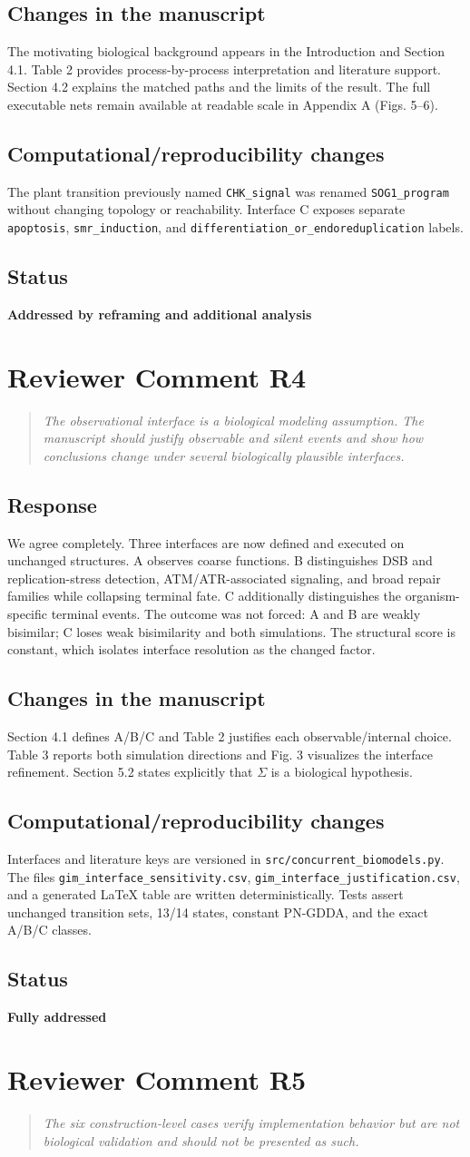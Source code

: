 \documentclass[11pt]{article}
\newcommand{\reviewcomment}[2]{%
  \section*{Reviewer Comment #1}
  \begin{quote}\itshape #2\end{quote}}
\newcommand{\response}{\subsection*{Response}}
\newcommand{\manuscriptchanges}{\subsection*{Changes in the manuscript}}
\newcommand{\computationalchanges}{\subsection*{Computational/reproducibility changes}}
\newcommand{\status}[1]{\subsection*{Status}\textbf{#1}}
\begin{document}
\manuscriptchanges
The motivating biological background appears in the Introduction and Section
4.1. Table 2 provides process-by-process interpretation and literature support.
Section 4.2 explains the matched paths and the limits of the result. The full
executable nets remain available at readable scale in Appendix A (Figs. 5--6).

\computationalchanges
The plant transition previously named \nolinkurl{CHK_signal} was renamed
\nolinkurl{SOG1_program} without changing topology or reachability. Interface C
exposes separate \nolinkurl{apoptosis}, \nolinkurl{smr_induction}, and
\nolinkurl{differentiation_or_endoreduplication} labels.

\status{Addressed by reframing and additional analysis}

\reviewcomment{R4}{The observational interface is a biological modeling
assumption. The manuscript should justify observable and silent events and show
how conclusions change under several biologically plausible interfaces.}

\response
We agree completely. Three interfaces are now defined and executed on unchanged
structures. A observes coarse functions. B distinguishes DSB and
replication-stress detection, ATM/ATR-associated signaling, and broad repair
families while collapsing terminal fate. C additionally distinguishes the
organism-specific terminal events. The outcome was not forced: A and B are
weakly bisimilar; C loses weak bisimilarity and both simulations. The structural
score is constant, which isolates interface resolution as the changed factor.

\manuscriptchanges
Section 4.1 defines A/B/C and Table 2 justifies each observable/internal choice.
Table 3 reports both simulation directions and Fig. 3 visualizes the interface
refinement. Section 5.2 states explicitly that $\Sigma$ is a biological
hypothesis.

\computationalchanges
Interfaces and literature keys are versioned in
\nolinkurl{src/concurrent_biomodels.py}. The files
\nolinkurl{gim_interface_sensitivity.csv},
\nolinkurl{gim_interface_justification.csv}, and a generated LaTeX table are
written deterministically. Tests assert unchanged transition sets, 13/14 states,
constant PN-GDDA, and the exact A/B/C classes.

\status{Fully addressed}

\reviewcomment{R5}{The six construction-level cases verify implementation
behavior but are not biological validation and should not be presented as such.}
\end{document}
